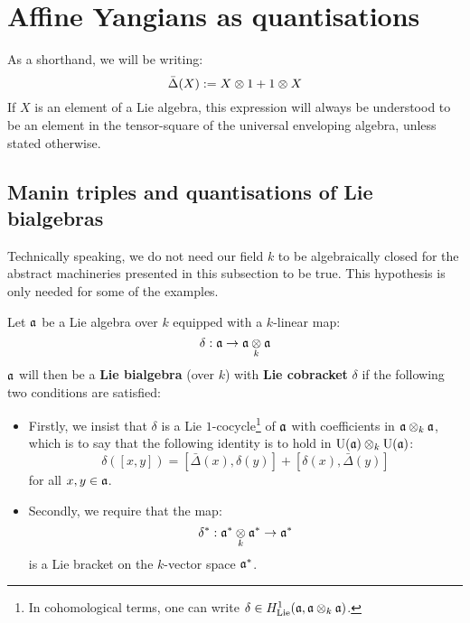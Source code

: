 \section{Affine Yangians as quantisations}
    \begin{convention}
        As a shorthand, we will be writing:
            $$\bar{\Delta}(X) := X \tensor 1 + 1 \tensor X$$
        If $X$ is an element of a Lie algebra, this expression will always be understood to be an element in the tensor-square of the universal enveloping algebra, unless stated otherwise.
    \end{convention}

    \subsection{Manin triples and quantisations of Lie bialgebras} \label{subsection: manin_triples_and_quantisations_of_lie_bialgebras}
        \begin{remark}
            Technically speaking, we do not need our field $k$ to be algebraically closed for the abstract machineries presented in this subsection to be true. This hypothesis is only needed for some of the examples. 
        \end{remark}
    
        \begin{definition} \label{def: lie_bialgebras}
            Let $\mathfrak{a}$ be a Lie algebra over $k$ equipped with a $k$-linear map:
                $$\delta: \a \to \a \tensor_k \a$$
            $\mathfrak{a}$ will then be a \textbf{Lie bialgebra} (over $k$) with \textbf{Lie cobracket} $\delta$ if the following two conditions are satisfied:
            \begin{itemize}
                \item Firstly, we insist that $\delta$ is a Lie $1$-cocycle\footnote{In cohomological terms, one can write $\delta \in H^1_{\Lie}(\a, \a \tensor_k \a)$.} of $\mathfrak{a}$ with coefficients in $\a \tensor_k \a$, which is to say that the following identity is to hold in $\rmU(\a) \tensor_k \rmU(\a)$:
                    $$\delta( [x, y] ) = [\bar{\Delta}(x), \delta(y)] + [\delta(x), \bar{\Delta}(y)]$$
                for all $x, y \in \mathfrak{a}$.
                \item Secondly, we require that the map:
                    $$\delta^*: \a^* \tensor_k \a^* \to \a^*$$
                is a Lie bracket on the $k$-vector space $\mathfrak{a}^*$.
            \end{itemize}
        \end{definition}

